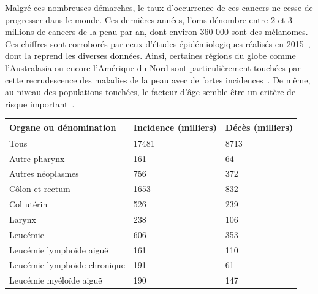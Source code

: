 Malgré ces nombreuses démarches, le taux d’occurrence de ces cancers ne cesse de progresser dans le monde. Ces dernières années, l'\gls{oms} dénombre entre 2 et 3 millions de cancers de la peau par an, dont environ 360 000 sont des mélanomes. Ces chiffres sont corroborés par ceux d'études épidémiologiques réalisés en 2015~\cite{Vos2016}, dont la  reprend les diverses données. Ainsi, certaines régions du globe comme l'Australasia ou encore l'Amérique du Nord sont particulièrement touchées par cette recrudescence des maladies de la peau avec de fortes incidences~\cite{Karimkhani2017}. De même, au niveau des populations touchées, le facteur d'âge semble être un critère de risque important~\cite{Karimkhani2017}.\par 

\begin{table}[H]
    \centering
    \begin{tabular}{lll} \toprule
        \textbf{Organe ou dénomination}         & \textbf{Incidence (milliers)} & \textbf{Décès (milliers)} \\ \midrule
        Tous                                    & 17481                         & 8713                      \\
        Autre pharynx                           & 161                           & 64                        \\
        Autres néoplasmes                       & 756                           & 372                       \\
        Côlon et rectum                         & 1653                          & 832                       \\
        Col utérin                              & 526                           & 239                       \\
        Larynx                                  & 238                           & 106                       \\
        Leucémie                                & 606                           & 353                       \\
        Leucémie lymphoïde aiguë                & 161                           & 110                       \\
        Leucémie lymphoïde chronique            & 191                           & 61                        \\
        Leucémie myéloïde aiguë                 & 190                           & 147                       \\

\end{tabular}
\end{table}
